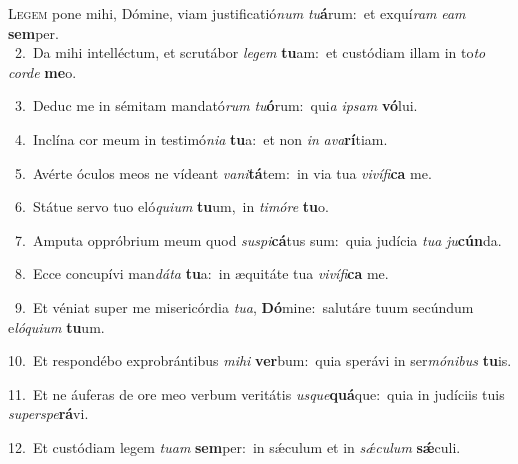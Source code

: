 \lettrine{\initial\textcolor{\initialcolor}{L}}{egem} pone mihi, Dómine, viam justificatió\textit{num} \textit{tu}\-\textbf{á}rum:~\star et exquí\textit{ram} \textit{e}\-\textit{am} \textbf{sem}\-per.\\
{\numbfont\textcolor{\numbcolor}{~2.}}~Da mihi intelléctum, et scrutábor \textit{le}\-\textit{gem} \textbf{tu}\-am:~\star et custódiam illam in to\textit{to} \textit{cor}\-\textit{de} \textbf{me}\-o.\par
{\numbfont\textcolor{\numbcolor}{~3.}}~Deduc me in sémitam mandató\textit{rum} \textit{tu}\-\textbf{ó}rum:~\star qui\textit{a} \textit{ip}\-\textit{sam} \textbf{vó}\-lui.\par
{\numbfont\textcolor{\numbcolor}{~4.}}~Inclína cor meum in testimó\-\textit{ni}\-\textit{a} \textbf{tu}\-a:~\star et non \textit{in} \textit{a}\-\textit{va}\textbf{rí}tiam.\par
{\numbfont\textcolor{\numbcolor}{~5.}}~Avérte óculos meos ne vídeant \textit{va}\-\textit{ni}\textbf{tá}tem:~\star in via tua \textit{vi}\-\textit{ví}\textit{fi}\textbf{ca} me.\par
{\numbfont\textcolor{\numbcolor}{~6.}}~Státue servo tuo eló\-\textit{qui}\-\textit{um} \textbf{tu}\-um,~\star in \textit{ti}\-\textit{mó}\textit{re} \textbf{tu}\-o.\par
{\numbfont\textcolor{\numbcolor}{~7.}}~Amputa oppróbrium meum quod \textit{su}\-\textit{spi}\textbf{cá}tus sum:~\star quia judícia \textit{tu}\-\textit{a} \textit{ju}\-\textbf{cún}da.\par
{\numbfont\textcolor{\numbcolor}{~8.}}~Ecce concupívi man\-\textit{dá}\-\textit{ta} \textbf{tu}\-a:~\star in æquitáte tua \textit{vi}\-\textit{ví}\textit{fi}\textbf{ca} me.\par
{\numbfont\textcolor{\numbcolor}{~9.}}~Et véniat super me misericórdia \textit{tu}\-\textit{a}, \textbf{Dó}\-mine:~\star salutáre tuum secúndum e\-\textit{ló}\-\textit{qui}\textit{um} \textbf{tu}\-um.\par
{\numbfont\textcolor{\numbcolor}{10.}}~Et respondébo exprobrántibus \textit{mi}\-\textit{hi} \textbf{ver}\-bum:~\star quia sperávi in ser\-\textit{mó}\-\textit{ni}\textit{bus} \textbf{tu}\-is.\par
{\numbfont\textcolor{\numbcolor}{11.}}~Et ne áuferas de ore meo verbum veritátis \textit{us}\-\textit{que}\textbf{quá}que:~\star quia in judíciis tuis \textit{su}\-\textit{per}\textit{spe}\textbf{rá}vi.\par
{\numbfont\textcolor{\numbcolor}{12.}}~Et custódiam legem \textit{tu}\-\textit{am} \textbf{sem}\-per:~\star in sǽculum et in \textit{sǽ}\-\textit{cu}\textit{lum} \textbf{sǽ}\-culi.\par
